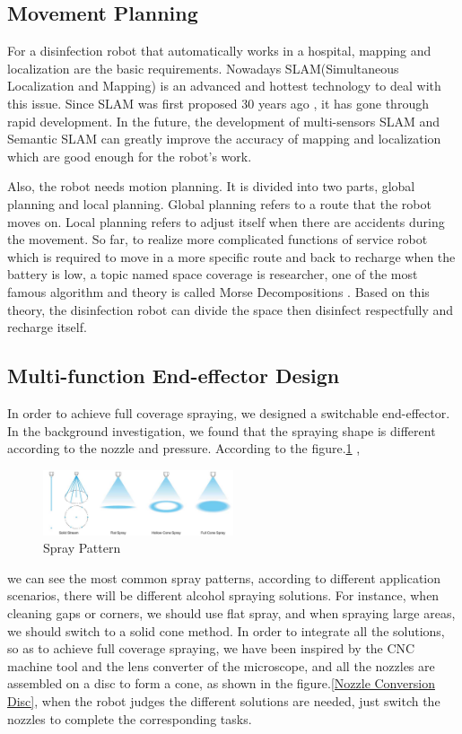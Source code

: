 \subsection{Movement Planning}
For a disinfection robot that automatically works in a hospital, mapping and localization are the basic requirements. Nowadays SLAM(Simultaneous Localization and Mapping) is an advanced and hottest technology to deal with this issue. Since SLAM was first proposed 30 years ago \cite{pritsker1984introduction}, it has gone through rapid development. In the future, the development of multi-sensors SLAM \cite{zhang2013application} and Semantic SLAM \cite{bowman2017probabilistic} can greatly improve the accuracy of mapping and localization which are good enough for the robot's work.
\par Also, the robot needs motion planning. It is divided into two parts, global planning and local planning. Global planning refers to a route that the robot moves on. Local planning refers to adjust itself when there are accidents during the movement. So far, to realize more complicated functions of service robot which is required to move in a more specific route and back to recharge when the battery is low, a topic named space coverage is researcher, one of the most famous algorithm and theory is called Morse Decompositions \cite{acar2002morse}. Based on this theory, the disinfection robot can divide the space then disinfect respectfully and recharge itself. 
              

\subsection{Multi-function End-effector Design}

In order to achieve full coverage spraying, we designed a switchable end-effector. In the background investigation, we found that the spraying shape is different according to the nozzle and pressure. According to the figure.\ref{spray pattern} \cite{ikeuchi_2021},
\begin{figure}[htbp] 
\centering 
\includegraphics[width=0.5\textwidth]{figures/Spray-pattern.jpg} 
\caption{Spray Pattern} 
\label{spray pattern} 
\end{figure} 
we can see the most common spray patterns, according to different application scenarios, there will be different alcohol spraying solutions. For instance, when cleaning gaps or corners, we should use flat spray, and when spraying large areas, we should switch to a solid cone method. In order to integrate all the solutions, so as to achieve full coverage spraying, we have been inspired by the CNC machine tool and the lens converter of the microscope, and all the nozzles are assembled on a disc to form a cone, as shown in the figure.\ref{Nozzle Conversion Disc}, when the robot judges the different solutions are needed, just switch the nozzles to complete the corresponding tasks.


